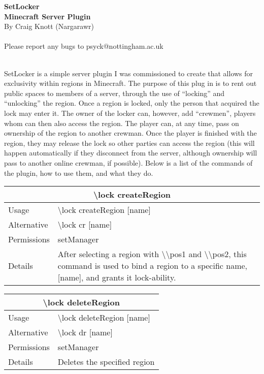\documentclass[a4paper,twoside,notitlepage,11pt]{article}
\newcommand{\nin}{\noindent}
\begin{document}
\pagestyle{empty}
\begin{center}
   \textbf{SetLocker\ \\Minecraft Server Plugin} \ \\
   By Craig Knott (Nargarawr) \ \\
   \ \\
   Please report any bugs to psyck@nottingham.ac.uk
\end{center}
\ \\
\nin
SetLocker is a simple server plugin I was commissioned to create that allows for exclusivity within regions in Minecraft. The purpose of this plug in is to rent out public spaces to members of a server, through the use of ``locking'' and ``unlocking'' the region. Once a region is locked, only the person that acquired the lock may enter it. The owner of the locker can, however, add ``crewmen'', players whom can then also access the region. The player can, at any time, pass on ownership of the region to another crewman. Once the player is finished with the region, they may release the lock so other parties can access the region (this will happen automatically if they disconnect from the server, although ownership will pass to another online crewman, if possible). Below is a list of the commands of the plugin, how to use them, and what they do.

\begin{center}
\begin{tabular}{|p{2cm}|p{12.5cm}|} \hline
\multicolumn{2}{|c|}{\textbf{\textbackslash lock createRegion}} \\ \hline
Usage       & \textbackslash lock createRegion [name] \\ \hline
Alternative & \textbackslash lock cr [name] \\ \hline
Permissions & setManager \\ \hline
Details 	& After selecting a region with \textbackslash\textbackslash pos1 and \textbackslash\textbackslash pos2, this command is used to bind a region to a specific name, [name], and grants it lock-ability. \\ \hline
\end{tabular}
\end{center}

\begin{center}
\begin{tabular}{|p{2cm}|p{12.5cm}|} \hline
\multicolumn{2}{|c|}{\textbf{\textbackslash lock deleteRegion}} \\ \hline
Usage       & \textbackslash lock deleteRegion [name] \\ \hline
Alternative & \textbackslash lock dr [name] \\ \hline
Permissions & setManager \\ \hline
Details 	& Deletes the specified region \\ \hline
\end{tabular}
\end{center}
\end{document}

